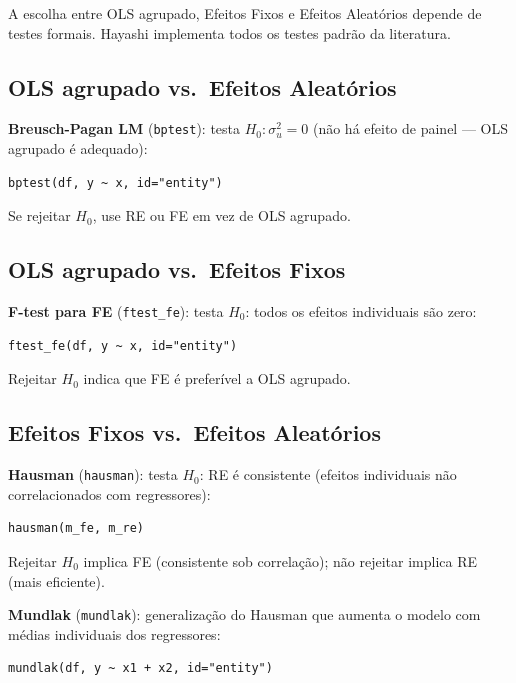 A escolha entre OLS agrupado, Efeitos Fixos e Efeitos Aleatórios depende de
testes formais. Hayashi implementa todos os testes padrão da literatura.

\subsection{OLS agrupado vs.\ Efeitos Aleatórios}

\textbf{Breusch-Pagan LM} (\texttt{bptest}): testa $H_0: \sigma_u^2 = 0$
(não há efeito de painel — OLS agrupado é adequado):

\begin{lstlisting}
bptest(df, y ~ x, id="entity")
\end{lstlisting}

Se rejeitar $H_0$, use RE ou FE em vez de OLS agrupado.

\subsection{OLS agrupado vs.\ Efeitos Fixos}

\textbf{F-test para FE} (\texttt{ftest\_fe}): testa $H_0$: todos os efeitos
individuais são zero:

\begin{lstlisting}
ftest_fe(df, y ~ x, id="entity")
\end{lstlisting}

Rejeitar $H_0$ indica que FE é preferível a OLS agrupado.

\subsection{Efeitos Fixos vs.\ Efeitos Aleatórios}

\textbf{Hausman} (\texttt{hausman}): testa $H_0$: RE é consistente (efeitos
individuais não correlacionados com regressores):

\begin{lstlisting}
hausman(m_fe, m_re)
\end{lstlisting}

Rejeitar $H_0$ implica FE (consistente sob correlação); não rejeitar implica
RE (mais eficiente).

\textbf{Mundlak} (\texttt{mundlak}): generalização do Hausman que aumenta o
modelo com médias individuais dos regressores:

\begin{lstlisting}
mundlak(df, y ~ x1 + x2, id="entity")
\end{lstlisting}

